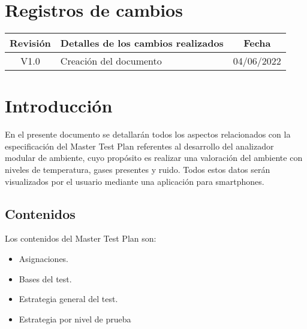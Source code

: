 \documentclass[
11pt, %
]{charter}
\begin{document}
\maketitle
\thispagestyle{empty}
\pagebreak


\thispagestyle{empty}
{\setlength{\parskip}{0pt}
\tableofcontents{}
}
\pagebreak


\section*{Registros de cambios}
\label{sec:registro}

\begin{table}[ht]
    \label{tab:registro}
    \centering
    \begin{tabularx}{\linewidth}{@{}|c|X|c|@{}}
        \hline
        \rowcolor[HTML]{d6c6c3} 
        \bf Revisión & \multicolumn{1}{c|}{\bf Detalles de los cambios
        realizados}  &
        \bf Fecha
        \\ \hline
        V1.0         & Creación del documento
                     & 04/06/2022
        \\
        \hline
    \end{tabularx}
\end{table}

\pagebreak

\section{Introducción}
En el presente documento se detallarán todos los aspectos relacionados con la
especificación del Master Test Plan referentes al desarrollo del analizador
modular de ambiente, cuyo propósito es realizar una valoración del ambiente con
niveles de temperatura, gases presentes y ruido. Todos estos datos serán
visualizados por el usuario mediante una aplicación para smartphones.
\subsection{Contenidos}
Los contenidos del Master Test Plan son:
\begin{itemize}
    \item Asignaciones.
    \item Bases del test.
    \item Estrategia general del test.
    \item Estrategia por nivel de prueba
\end{itemize}
\end{document}
